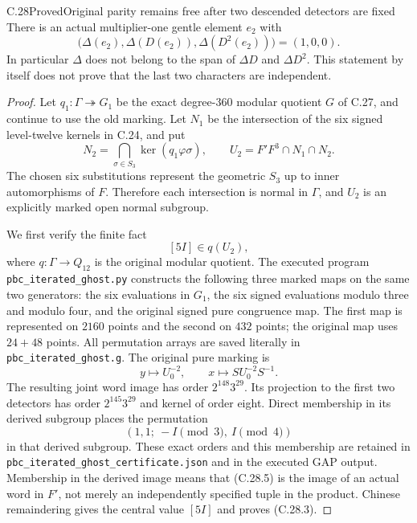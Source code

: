 \begin{statement}{C.28}{Proved}{Original parity remains free after two descended detectors are fixed}
There is an actual multiplier-one gentle element $e_2$ with
\[
 \bigl(\Delta(e_2),\Delta(D(e_2)),\Delta(D^2(e_2))\bigr)
                         =(1,0,0).
 \tag{C.28.1}
\]
In particular $\Delta$ does not belong to the span of
$\Delta D$ and $\Delta D^2$. This statement by itself
does not prove that the last two characters are independent.
\end{statement}
\begin{proof}
Let $q_1:\Gamma\twoheadrightarrow G_1$ be the exact
degree-$360$ modular quotient $G$ of C.27, and continue
to use the old marking. Let $N_1$ be the intersection
of the six signed level-twelve kernels in C.24, and put
\[
 N_2=\bigcap_{\sigma\in S_3}
                 \ker(q_1\varphi\sigma),\qquad
 U_2=F'F^3\cap N_1\cap N_2.
 \tag{C.28.2}
\]
The chosen six substitutions represent the geometric
$S_3$ up to inner automorphisms of $F$. Therefore each
intersection is normal in $\Gamma$, and $U_2$ is an
explicitly marked open normal subgroup.

We first verify the finite fact
\[
                         [5I]\in q(U_2),
 \tag{C.28.3}
\]
where $q:\Gamma\to Q_{12}$ is the original modular
quotient. The executed program
\texttt{pbc\_iterated\_\allowbreak ghost.py} constructs the following
three marked maps on the same two generators:
the six evaluations in $G_1$, the six signed evaluations
modulo three and modulo four, and the original signed
pure congruence map. The first map is represented on
$2160$ points and the second on $432$ points; the original
map uses $24+48$ points. All permutation arrays are saved
literally in \texttt{pbc\_iterated\_\allowbreak ghost.g}.
The original pure marking is
\[
       y\longmapsto U_0^{-2},\qquad
       x\longmapsto S U_0^{-2}S^{-1}.
 \tag{C.28.4}
\]
The resulting joint word image has order
$2^{148}3^{29}$. Its projection to the first two
detectors has order $2^{145}3^{29}$ and kernel of
order eight. Direct membership in its derived subgroup
places the permutation
\[
 \left(1,1;\ -I\pmod3,\ I\pmod4\right)
 \tag{C.28.5}
\]
in that derived subgroup. These exact orders and this
membership are retained in
\texttt{pbc\_iterated\_\allowbreak ghost\_\allowbreak certificate.json} and
in the executed GAP output. Membership in the derived
image means that (C.28.5) is the image of an actual
word in $F'$, not merely an independently specified
tuple in the product. Chinese remaindering gives
the central value $[5I]$ and proves (C.28.3).


\end{proof}
